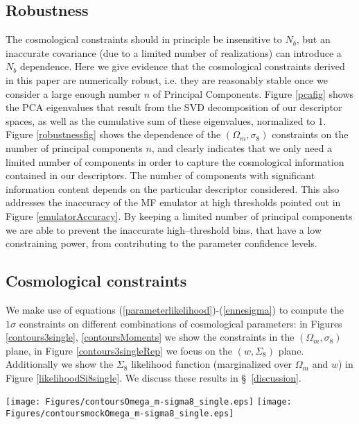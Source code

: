 \documentclass[reprint,aps,prd,superscriptaddress,showkeys,showpacs]{revtex4-1}
\begin{document}
\subsection{Robustness}
%
The cosmological constraints should in principle be insensitive to $N_b$, but an inaccurate covariance (due to a limited number of realizations) can introduce a $N_b$ dependence. Here we give evidence that the cosmological constraints derived in this paper are numerically robust, i.e. they are reasonably stable once we consider a large enough number $n$ of Principal Components. 
Figure \ref{pcafig} shows the PCA eigenvalues that result from the SVD decomposition of our descriptor spaces, as well as the cumulative sum of these eigenvalues, normalized to 1. Figure \ref{robustnessfig} shows the dependence of the $(\Omega_m,\sigma_8)$ constraints on the number of principal components $n$, and clearly indicates that we only need a limited number of components in order to capture the cosmological information contained in our descriptors. The number of components with significant information content depends on the particular descriptor considered. This also addresses the inaccuracy of the MF emulator at high thresholds pointed out in Figure \ref{emulatorAccuracy}. By keeping a limited number of principal components we are able to prevent the inaccurate high--threshold bins, that have a low constraining power, from contributing to the parameter confidence levels.    


\subsection{Cosmological constraints}
%
We make use of equations (\ref{parameterlikelihood})-(\ref{ennesigma}) to compute the $1\sigma$ constraints on different combinations of cosmological parameters: in Figures \ref{contours3single}, \ref{contoursMoments} we show the constraints in the $(\Omega_m,\sigma_8)$ plane, in Figure \ref{contours3singleRep} we focus on the $(w,\Sigma_8)$ plane. Additionally we show the $\Sigma_8$ likelihood function (marginalized over $\Omega_m$ and $w$) in Figure \ref{likelihoodSi8single}. We discuss these results in \S~\ref{discussion}. 

\begin{figure*}
\begin{center}
\texttt{[image: Figures/contoursOmega\_m-sigma8\_single.eps]}
\texttt{[image: Figures/contoursmockOmega\_m-sigma8\_single.eps]}
\end{center}
\caption{$1\sigma$ constraints on the $(\Omega_m,\sigma_8)$ parameter doublet using the Power Spectrum (red), $V_0$ (green), $V_1$ (blue), $V_2$ (black) and Moments (orange) statistics. We show the constraints from the data (left panel) and from a mock observation constructed using the mean of 1000 realizations in CFHTcov simulations as data (right panel). The contours are calculated from the parameter likelihood function $\mathcal{L}$ marginalized over $w$. The parentheses near the descriptor label refer to the number of principal components.}
\label{contours3single}
\end{figure*}
\end{document}
